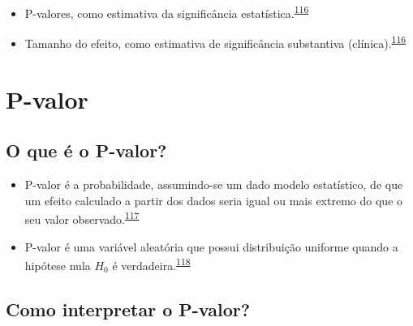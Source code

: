 \documentclass[
  a4paper,
]{book}
\begin{document}
\begin{itemize}
\item
  P-valores, como estimativa da significância estatística.\textsuperscript{\protect\hyperlink{ref-Sullivan2012}{116}}
\item
  Tamanho do efeito, como estimativa de significância substantiva (clínica).\textsuperscript{\protect\hyperlink{ref-Sullivan2012}{116}}
\end{itemize}

\hypertarget{p-valor}{%
\section{P-valor}\label{p-valor}}

\hypertarget{o-que-uxe9-o-p-valor}{%
\subsection{O que é o P-valor?}\label{o-que-uxe9-o-p-valor}}

\begin{itemize}
\item
  P-valor é a probabilidade, assumindo-se um dado modelo estatístico, de que um efeito calculado a partir dos dados seria igual ou mais extremo do que o seu valor observado.\textsuperscript{\protect\hyperlink{ref-wasserstein2016}{117}}
\item
  P-valor é uma variável aleatória que possui distribuição uniforme quando a hipótese nula \(H_{0}\) é verdadeira.\textsuperscript{\protect\hyperlink{ref-altman2017}{118}}
\end{itemize}

\hypertarget{como-interpretar-o-p-valor}{%
\subsection{Como interpretar o P-valor?}\label{como-interpretar-o-p-valor}}
\end{document}
